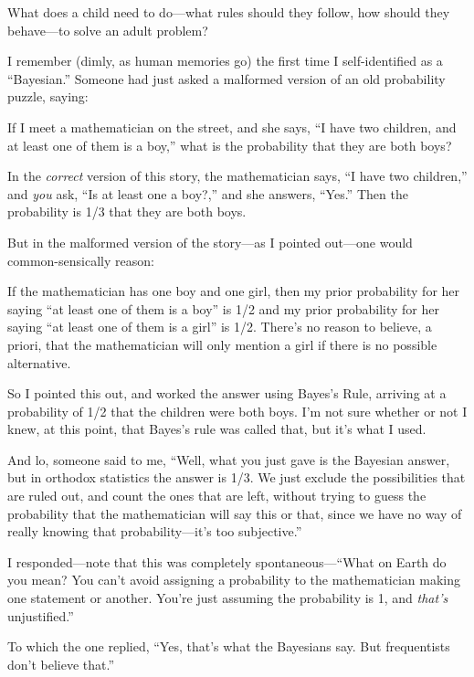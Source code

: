 {
 What does a child need to do---what rules should they follow, how
should they behave---to solve an adult problem?}

\myendsectiontext


{
 I remember (dimly, as human memories go) the first time I
self-identified as a ``Bayesian.''
Someone had just asked a malformed version of an old probability
puzzle, saying:}

{
 If I meet a mathematician on the street, and she says,
``I have two children, and at least one of them is a
boy,'' what is the probability that they are both
boys?}

{
 In the \textit{correct} version of this story, the mathematician
says, ``I have two children,'' and
\textit{you} ask, ``Is at least one a
boy?,'' and she answers,
``Yes.'' Then the probability is 1/3
that they are both boys.}

{
 But in the malformed version of the story---as I pointed out---one
would common-sensically reason:}

{
 If the mathematician has one boy and one girl, then my prior
probability for her saying ``at least one of them is a
boy'' is 1/2 and my prior probability for her saying
``at least one of them is a girl''
is 1/2. There's no reason to believe, a priori, that
the mathematician will only mention a girl if there is no possible
alternative.}

{
 So I pointed this out, and worked the answer using
Bayes's Rule, arriving at a probability of 1/2 that the
children were both boys. I'm not sure whether or not I
knew, at this point, that Bayes's rule was called that,
but it's what I used.}

{
 And lo, someone said to me, ``Well, what you just
gave is the Bayesian answer, but in orthodox statistics the answer is
1/3. We just exclude the possibilities that are ruled out, and count
the ones that are left, without trying to guess the probability that
the mathematician will say this or that, since we have no way of really
knowing that probability---it's too
subjective.''}

{
 I responded---note that this was completely
spontaneous---``What on Earth do you mean? You
can't avoid assigning a probability to the
mathematician making one statement or another. You're
just assuming the probability is 1, and \textit{that's}
unjustified.''}

{
 To which the one replied, ``Yes,
that's what the Bayesians say. But frequentists
don't believe that.''}

